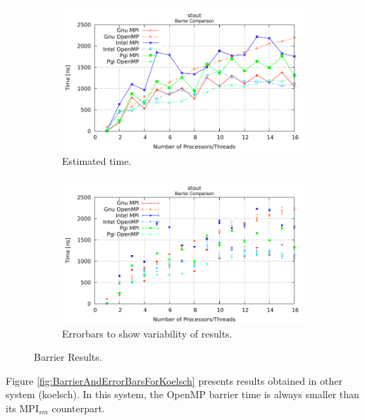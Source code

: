 \begin{figure} [h!]
    \centering
    \captionsetup{justification=centering, singlelinecheck=false}
    \begin{subfigure}{.6\textwidth}
      \centering
      \hspace*{-1.5cm} 
      \includegraphics[width=0.95\linewidth]{Plots/barrier/stout.pdf}
      \caption[]{Estimated time.}
      \label{fig:BarrierStout}
    \end{subfigure}%
    \begin{subfigure}{.6\textwidth}
      \centering
      \hspace*{-1.5cm} 
      \includegraphics[width=0.95\linewidth]{Plots/barrier/stoutError.pdf}
      \caption{Errorbars to show variability of results.}
      \label{fig:BarrierErrorBarsStout}
    \end{subfigure}
\caption{Barrier Results.}
\label{fig:BarrierAndErrorBarsForStout}
\end{figure}

\medskip

Figure \ref{fig:BarrierAndErrorBarsForKoelsch} presents results obtained in other system (koelsch). In this system, the OpenMP barrier time is always smaller than its MPI$_{sm}$ counterpart.

